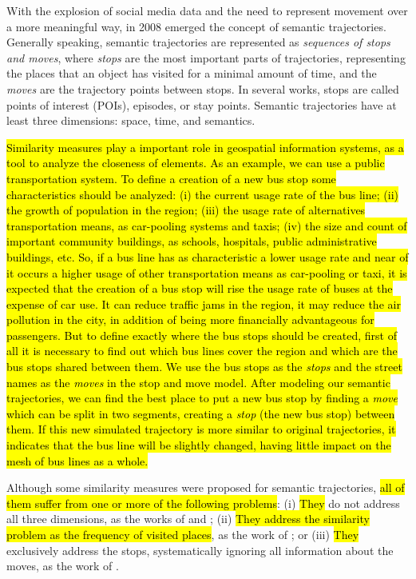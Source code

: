 \documentclass[12pt]{article}
\begin{document}
With the explosion of social media data and the need to represent movement over a more meaningful way, in 2008 emerged the concept of semantic trajectories\cite{Spaccapietra:2008:CVT:1347466.1347785}. Generally speaking, semantic trajectories are represented as \emph{sequences of stops and moves}, where \emph{stops} are the most important parts of trajectories, representing the places that an object has visited for a minimal amount of time, and the \emph{moves} are the trajectory points between stops. In several works, stops are called points of interest (POIs), episodes, or stay points. Semantic trajectories have at least three dimensions: space, time, and semantics.

\hl{Similarity measures play a important role in geospatial information systems, as a tool to analyze the closeness of elements. As an example, we can use a public transportation system. To define a creation of a new bus stop some characteristics should be analyzed: (i) the current usage rate of the bus line; (ii) the growth of population in the region; (iii) the usage rate of alternatives transportation means, as car-pooling systems and taxis; (iv) the size and count of important community buildings, as schools, hospitals, public administrative buildings, etc. So, if a bus line has as characteristic a lower usage rate and near of it occurs a higher usage of other transportation means as car-pooling or taxi, it is expected that the creation of a bus stop will rise the usage rate of buses at the expense of car use. It can reduce traffic jams in the region, it may reduce the air pollution in the city, in addition of being more financially advantageous for passengers. But to define exactly where the bus stops should be created, first of all it is necessary to find out which bus lines cover the region and which are the bus stops shared between them. We use the bus stops as the \emph{stops} and the street names as the \emph{moves} in the stop and move model. After modeling our semantic trajectories, we can find the best place to put a new bus stop by finding a \emph{move} which can be split in two segments, creating a \emph{stop} (the new bus stop) between them. If this new simulated trajectory is more similar to original trajectories, it indicates that the bus line will be slightly changed, having little impact on the mesh of bus lines as a whole.}

Although some similarity measures were proposed for semantic trajectories, {\hl{all of them suffer from one or more of the following problems}}: (i) {\hl{They}} do not address all three dimensions, as the works of \cite{Kang:2009:SMT:1529282.1529580} and \cite{Liu:2012:SMM:2442968.2442971}; (ii) {\hl{They address the similarity problem as the frequency of visited places}}, as the work of \cite{Ying:2010:MUS:1867699.1867703}; or (iii) {\hl{They}} exclusively address the stops, systematically ignoring all information about the moves, as the work of \cite{Furtado:TGIS12156}.
\end{document}
